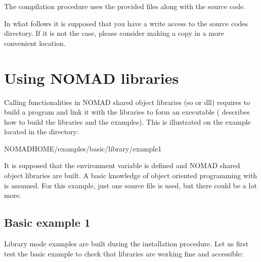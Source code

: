 \documentclass[letterpaper,10pt,english]{sphinxmanual}
\begin{document}
\sphinxAtStartPar
The compilation procedure uses the provided  files along with the source code.

\sphinxAtStartPar
In what follows it is supposed that you have a write access to the source codes directory.
If it is not the case, please consider making a copy in a more convenient location.


\section{Using NOMAD libraries}
\label{\detokenize{LibraryMode:using-nomad-libraries}}
\sphinxAtStartPar
Calling functionalities in NOMAD shared object libraries (so or dll) requires to build a  program and link it with the libraries to form an executable
({\hyperref[\detokenize{Installation:installation}]{}} describes how to build the libraries and the examples). This is illustrated on the example located in the directory:

\begin{sphinxVerbatim}[commandchars=\\\{\}]
\PYGZdl{}NOMAD\PYGZus{}HOME/examples/basic/library/example1
\end{sphinxVerbatim}

\sphinxAtStartPar
It is supposed that the environment variable  is defined and NOMAD shared
object libraries are built. A basic knowledge of object oriented programming with  is assumed.
For this example, just one  source file is used, but there could be a lot more.


\subsection{Basic example 1}
\label{\detokenize{LibraryMode:basic-example-1}}
\sphinxAtStartPar
Library mode examples are built during the installation procedure. Let us first test the basic example to check that libraries are working fine and accessible:
\end{document}
